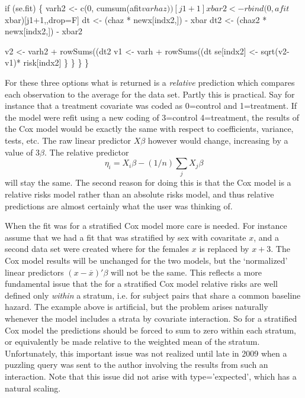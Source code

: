 \documentclass{article}
\begin{document}
\begin{nwchunk}
             if (se.fit) \{
                 varh2 <- c(0, cumsum(afit$varhaz))[j1+1]
                 xbar2 <- rbind(0, afit$xbar)[j1+1,,drop=F]
                 dt <- (chaz * newx[indx2,]) - xbar
                 dt2 <- (chaz2 * newx[indx2,]) - xbar2
 
                 v2 <- varh2 + rowSums((dt2 %
                 v1 <- varh +  rowSums((dt %
                 se[indx2] <- sqrt(v2-v1)* risk[indx2]
                 \}
             \}
         \}
     \}
\end{nwchunk}

For these three options what is returned is a \emph{relative} prediction
which compares each observation to the average for the data set.
Partly this is practical.  Say for instance that a treatment covariate
was coded as 0=control and 1=treatment.
If the model were refit using a new coding of 3=control 4=treatment, the
results of the Cox model would be exactly the same with respect to
coefficients, variance, tests, etc.  
The raw linear predictor $X\beta$ however would change, increasing by
a value of $3\beta$.  
The relative predictor 
\begin{equation}
  \eta_i = X_i\beta - (1/n)\sum_j X_j\beta
  \label{eq:eta}
\end{equation}
will stay the same.
The second reason for doing this is that the Cox model is a 
relative risks model rather than an absolute risks model,
and thus relative predictions are almost certainly what the 
user was thinking of.

When the fit was for a stratified Cox model more care is needed.
For instance assume that we had a fit that was stratified by sex with
covaritate $x$, and a second data set were created where for the
females $x$ is replaced
by $x+3$.  The Cox model results will be unchanged for the two
models, but the `normalized' linear predictors $(x - \overline x)'\beta$ %
will not be the same.
This reflects a more fundamental issue that the for a stratified
Cox model relative risks are well defined only \emph{within} a
stratum, i.e. for subject pairs that share a common baseline
hazard.
The example above is artificial, but the problem arises naturally
whenever the model includes a strata by covariate interaction.
So for a stratified Cox model the predictions should be forced to
sum to zero within each stratum, or equivalently be made relative
to the weighted mean of the stratum.
Unfortunately, this important issue was not realized until late in 2009
when a puzzling query was sent to the author involving the results
from such an interaction.
Note that this issue did not arise with type='expected', which 
has a natural scaling.
\end{document}
